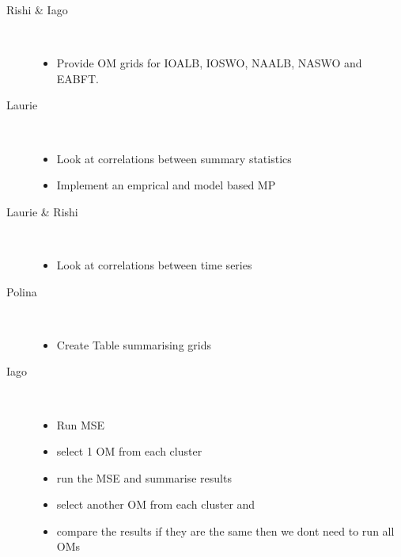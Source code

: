 \documentclass[a4paper,10pt]{article}
\begin{document}
\begin{description}
 \item[Rishi \& Iago] ~
 \begin{itemize}
  \item Provide OM grids for IOALB, IOSWO, NAALB, NASWO and EABFT.
 \end{itemize}

  \item[Laurie] ~
  \begin{itemize}
  \item Look at correlations between summary statistics
  \item Implement an emprical and model based MP
 \end{itemize}

 
  \item[Laurie \& Rishi] ~
  \begin{itemize}
  \item Look at correlations between time series
 \end{itemize}
 
 \item[Polina] ~
  \begin{itemize}
  \item  Create Table summarising grids
 \end{itemize}

 \item[Iago] ~
  \begin{itemize}
  \item  Run MSE
  \item select 1 OM from each cluster
  \item run the MSE and summarise results
  \item select another OM from each cluster and 
  \item compare the results if they are the same then we dont need to run all OMs
 \end{itemize}

\end{description}
\end{document}
